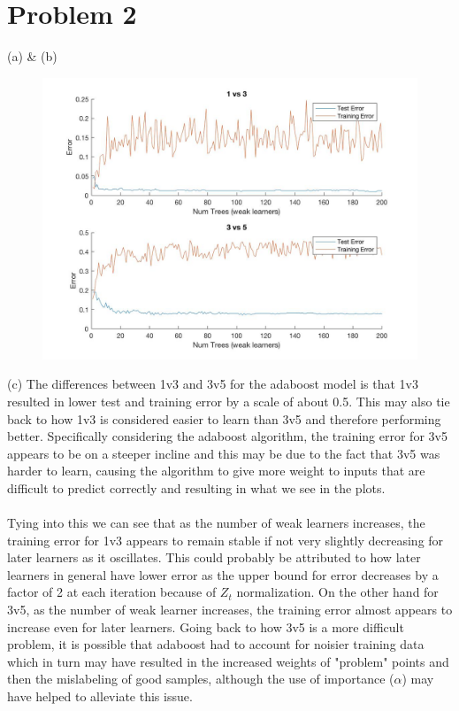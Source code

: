 \documentclass[12pt,letterpaper]{article}
\begin{document}
\section*{Problem 2}
\begin{description}
	\item (a) \& (b)
\begin{figure}[H]
\includegraphics[scale=0.4]{image2.jpg} 
\end{figure}
\item (c) The differences between 1v3 and 3v5 for the adaboost model is that 1v3 resulted in lower test and training error by a scale of about 0.5.  This may also tie back to how 1v3 is considered easier to learn than 3v5 and therefore performing better. Specifically considering the adaboost algorithm, the training error for 3v5 appears to be on a steeper incline and this may be due to the fact that 3v5 was harder to learn, causing the algorithm to give more weight to inputs that are difficult to predict correctly and resulting in what we see in the plots. 
\\\\Tying into this we can see that as the number of weak learners increases, the training error for 1v3 appears to remain stable if not very slightly decreasing for later learners as it oscillates. This could probably be attributed to how later learners in general have lower error as the upper bound for error decreases by a factor of 2 at each iteration because of $Z_t$ normalization. On the other hand for 3v5, as the number of weak learner increases, the training error almost appears to increase even for later learners. Going back to how 3v5 is a more difficult problem, it is possible that adaboost had to account for noisier training data which in turn may have resulted in the increased weights of "problem" points and then the mislabeling of good samples, although the use of importance ($\alpha$) may have helped to alleviate this issue.

\end{description}
\end{document}
